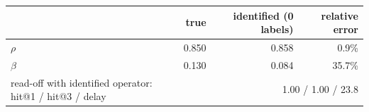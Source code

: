 \begin{center}\small\begin{tabular}{@{}lrrr@{}}\toprule & true & identified (0 labels) & relative error \\ \midrule
$\rho$ & 0.850 & 0.858 & 0.9\% \\
$\beta$ & 0.130 & 0.084 & 35.7\% \\
\midrule
read-off with identified operator: hit@1 / hit@3 / delay & \multicolumn{3}{r}{1.00 / 1.00 / 23.8} \\
\bottomrule\end{tabular}\end{center}
